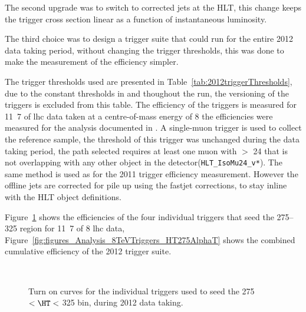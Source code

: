 The second upgrade was to switch to \pu corrected jets at the HLT, this 
change keeps the trigger cross section linear as a function of instantaneous 
luminosity.

The third choice was to design a trigger suite that could run for the entire 
2012 data taking period, without changing the trigger thresholds, this was 
done to make the measurement of the efficiency simpler.

The trigger thresholds used are presented in 
Table~\ref{tab:2012triggerThresholds}, due to the constant thresholds in 
\HT and \alt thoughout the run, the versioning of the triggers is excluded 
from this table.
The efficiency of the triggers is measured for \unit{11.7}{\invfb} of \ac{lhc} 
data taken at a centre-of-mass energy of \unit{8}{\TeV} the efficiencies were 
measured for the analysis documented in . A 
single-muon trigger is used to collect the reference sample, the threshold of 
this trigger was unchanged during the data taking period, the path selected 
requires at least one muon with \PT $>$ \unit{24}{\GeV} that is not overlapping 
with any other object in the detector(\texttt{HLT\_IsoMu24\_v*}). The same method is used as for the 2011 
trigger efficiency measurement. However the offline jets are corrected for pile 
up using the fastjet corrections, to stay inline with the HLT object 
definitions.

Figure~\ref{fig:2012TriggersHT275} shows the efficiencies of the four 
individual triggers that seed the \unit{275}{\GeV}--\unit{325}{\GeV} \HT region 
for \unit{11.7}{\invfb} of \unit{8}{\TeV} \ac{lhc} data, 
Figure~\ref{fig:figures_Analysis_8TeVTriggers_HT275AlphaT} shows the combined 
cumulative efficiency of the 2012 trigger suite.

\begin{figure}[|h]
  \centering
   \\
\caption{Turn on curves for the individual \alt triggers used to seed the 
\unit{275}{\GeV} $< \HT <$ \unit{325}{\GeV} bin, during 2012 data taking.}
\label{fig:2012TriggersHT275}


\end{figure}

